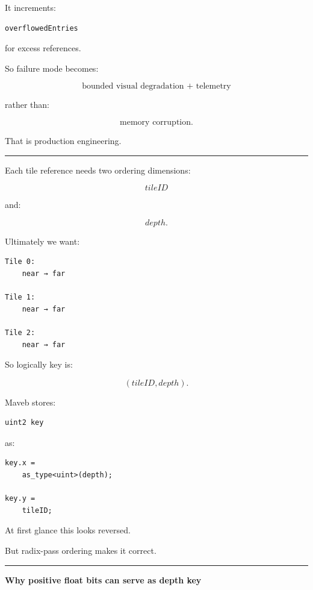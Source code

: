 It increments:

\protect{}\label{hhf4kg}%
\begin{verbatim}
overflowedEntries
\end{verbatim}

for excess references.

So failure mode becomes:

\[
\boxed{
\text{bounded visual degradation + telemetry}
}
\]

rather than:

\[
\boxed{
\text{memory corruption}.
}
\]

That is production engineering.

\begin{center}\rule{0.5\linewidth}{0.5pt}\end{center}

Each tile reference needs two ordering dimensions:

\[
tileID
\]

and:

\[
depth.
\]

Ultimately we want:

\protect{}\label{rgchv5}%
\begin{verbatim}
Tile 0:
    near → far

Tile 1:
    near → far

Tile 2:
    near → far
\end{verbatim}

So logically key is:

\[
\boxed{
(tileID,depth).
}
\]

Maveb stores:

\begin{verbatim}
uint2 key
\end{verbatim}

as:

\begin{verbatim}
key.x =
    as_type<uint>(depth);

key.y =
    tileID;
\end{verbatim}

At first glance this looks reversed.

But radix-pass ordering makes it correct.

\begin{center}\rule{0.5\linewidth}{0.5pt}\end{center}

\textbf{Why positive float bits can serve as depth key}

